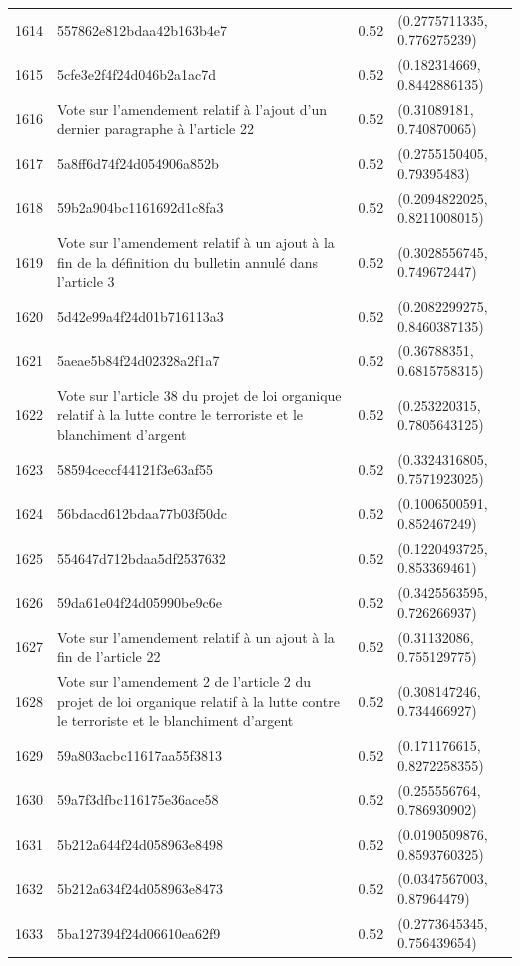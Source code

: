 \begin{table}[ht]
\begin{tabular}{rlrl}
  1614 & 557862e812bdaa42b163b4e7 & 0.52 & (0.2775711335, 0.776275239) \\ 
  1615 & 5cfe3e2f4f24d046b2a1ac7d & 0.52 & (0.182314669, 0.8442886135) \\ 
  1616 & Vote sur l'amendement relatif à l'ajout d'un dernier paragraphe à l'article 22 & 0.52 & (0.31089181, 0.740870065) \\ 
  1617 & 5a8ff6d74f24d054906a852b & 0.52 & (0.2755150405, 0.79395483) \\ 
  1618 & 59b2a904bc1161692d1c8fa3 & 0.52 & (0.2094822025, 0.8211008015) \\ 
  1619 & Vote sur l'amendement relatif à un ajout à la fin de la définition du bulletin annulé dans l'article 3 & 0.52 & (0.3028556745, 0.749672447) \\ 
  1620 & 5d42e99a4f24d01b716113a3 & 0.52 & (0.2082299275, 0.8460387135) \\ 
  1621 & 5aeae5b84f24d02328a2f1a7 & 0.52 & (0.36788351, 0.6815758315) \\ 
  1622 & Vote sur l'article 38 du projet de loi organique relatif à la lutte contre le terroriste et le blanchiment d'argent & 0.52 & (0.253220315, 0.7805643125) \\ 
  1623 & 58594ceccf44121f3e63af55 & 0.52 & (0.3324316805, 0.7571923025) \\ 
  1624 & 56bdacd612bdaa77b03f50dc & 0.52 & (0.1006500591, 0.852467249) \\ 
  1625 & 554647d712bdaa5df2537632 & 0.52 & (0.1220493725, 0.853369461) \\ 
  1626 & 59da61e04f24d05990be9c6e & 0.52 & (0.3425563595, 0.726266937) \\ 
  1627 & Vote sur l'amendement relatif à un ajout à la fin de l'article 22 & 0.52 & (0.31132086, 0.755129775) \\ 
  1628 & Vote sur l'amendement 2 de l'article 2 du projet de loi organique relatif à la lutte contre le terroriste et le blanchiment d'argent & 0.52 & (0.308147246, 0.734466927) \\ 
  1629 & 59a803acbc11617aa55f3813 & 0.52 & (0.171176615, 0.8272258355) \\ 
  1630 & 59a7f3dfbc116175e36ace58 & 0.52 & (0.255556764, 0.786930902) \\ 
  1631 & 5b212a644f24d058963e8498 & 0.52 & (0.0190509876, 0.8593760325) \\ 
  1632 & 5b212a634f24d058963e8473 & 0.52 & (0.0347567003, 0.87964479) \\ 
  1633 & 5ba127394f24d06610ea62f9 & 0.52 & (0.2773645345, 0.756439654) \\ 

\end{tabular}
\end{table}
